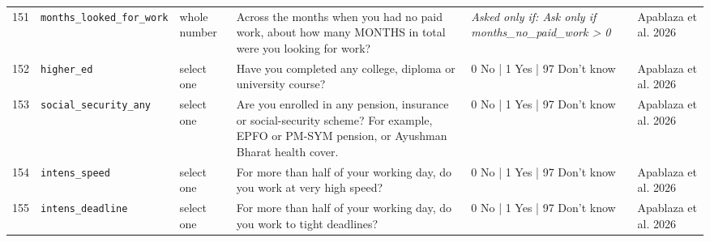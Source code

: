 \documentclass[9pt,a4paper,landscape]{article}
\begin{document}
\begin{longtable}{@{}p{0.5cm}p{3.3cm}p{1.7cm}p{7.3cm}p{5.6cm}p{5.4cm}@{}}
\footnotesize 151 & \footnotesize\texttt{months\_looked\_for\_work} & \scriptsize whole number & \footnotesize Across the months when you had no paid work, about how many MONTHS in total were you looking for work?\par\vspace{1pt}{\footnotesize\color{hdr}{\hifont जिन महीनों में आपके पास कोई पैसे वाला काम नहीं था, उनमें कुल मिलाकर लगभग कितने महीने आप काम ढूँढते रहे?}} & \scriptsize \textit{Asked only if: Ask only if months\_no\_paid\_work > 0} & \scriptsize Apablaza et al. 2026\\
\footnotesize 152 & \footnotesize\texttt{higher\_ed} & \scriptsize select one & \footnotesize Have you completed any college, diploma or university course?\par\vspace{1pt}{\footnotesize\color{hdr}{\hifont क्या आपने कॉलेज, डिप्लोमा या यूनिवर्सिटी का कोई कोर्स पूरा किया है?}} & \scriptsize 0 No | 1 Yes | 97 Don't know & \scriptsize Apablaza et al. 2026\\
\footnotesize 153 & \footnotesize\texttt{social\_security\_any} & \scriptsize select one & \footnotesize Are you enrolled in any pension, insurance or social-security scheme? For example, EPFO or PM-SYM pension, or Ayushman Bharat health cover.\par\vspace{1pt}{\footnotesize\color{hdr}{\hifont क्या आप किसी पेंशन, बीमा या सरकारी सामाजिक सुरक्षा योजना में शामिल हैं? जैसे EPFO या PM-SYM पेंशन, या आयुष्मान भारत स्वास्थ्य कवर।}} & \scriptsize 0 No | 1 Yes | 97 Don't know & \scriptsize Apablaza et al. 2026\\
\footnotesize 154 & \footnotesize\texttt{intens\_speed} & \scriptsize select one & \footnotesize For more than half of your working day, do you work at very high speed?\par\vspace{1pt}{\footnotesize\color{hdr}{\hifont काम के दिन के आधे से ज़्यादा समय, क्या आप बहुत तेज़ रफ़्तार से काम करते हैं?}} & \scriptsize 0 No | 1 Yes | 97 Don't know & \scriptsize Apablaza et al. 2026\\
\footnotesize 155 & \footnotesize\texttt{intens\_deadline} & \scriptsize select one & \footnotesize For more than half of your working day, do you work to tight deadlines?\par\vspace{1pt}{\footnotesize\color{hdr}{\hifont काम के दिन के आधे से ज़्यादा समय, क्या आपको कड़ी समय-सीमा में काम करना पड़ता है?}} & \scriptsize 0 No | 1 Yes | 97 Don't know & \scriptsize Apablaza et al. 2026\\

\end{longtable}
\end{document}
